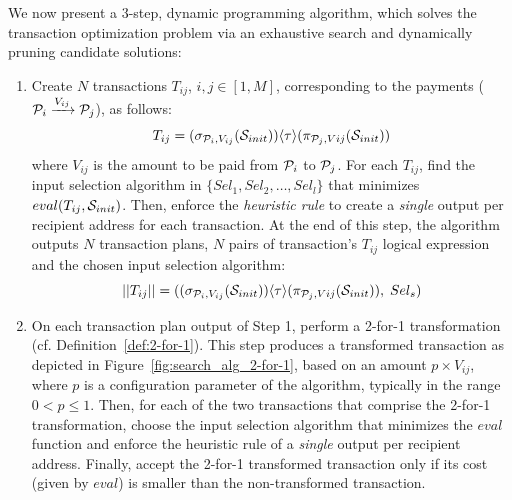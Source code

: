 We now present a 3-step, dynamic programming algorithm, which solves the
transaction optimization problem via an exhaustive search and
dynamically pruning candidate solutions:
\begin{enumerate}
    \item Create $N$ transactions $T_{ij}$, $i,j \in [1,M]$,
        corresponding to the payments ($\mathcal{P}_i \xrightarrow[]{V_{ij}} \mathcal{P}_j$),
        as follows:
        \begin{equation*}
            T_{ij} = (\sigma_{\mathcal{P}_i, V_{ij}}(\mathcal{S}_{init})) \langle \tau \rangle (\pi_{\mathcal{P}_j,V{ij}}(\mathcal{S}_{init}))
        \end{equation*}
        where $V_{ij}$ is the amount to be paid from $\mathcal{P}_i$ to $\mathcal{P}_j$.
        For each $T_{ij}$, find the input selection algorithm in
        $\{Sel_1, Sel_2, \dots, Sel_l\}$ that minimizes $eval(T_{ij},
        \mathcal{S}_{init})$. Then, enforce the \emph{heuristic rule} to
        create a \emph{single} output per recipient address for each
        transaction.
        At the end of this step, the algorithm outputs $N$ transaction plans,
        \ie $N$ pairs of transaction's $T_{ij}$ logical expression and the
        chosen
        input selection algorithm:
        \begin{equation*}
            ||T_{ij}|| = ((\sigma_{\mathcal{P}_i, V_{ij}}(\mathcal{S}_{init})) \langle \tau \rangle (\pi_{\mathcal{P}_j,V{ij}}(\mathcal{S}_{init})),\; Sel_s)
        \end{equation*}

    \item On each transaction plan output of Step 1, perform a 2-for-1
        transformation (cf. Definition~\ref{def:2-for-1}). This step produces a
        transformed transaction as
        depicted in Figure~\ref{fig:search_alg_2-for-1}, based on an amount
        $p\times V_{ij}$, where $p$ is a
        configuration parameter of the algorithm, typically in the range $0 < p
        \leq 1$.
        Then, for each of the two transactions that comprise the 2-for-1
        transformation, choose the input selection algorithm that minimizes the
        $eval$ function and enforce the heuristic rule of a \emph{single}
        output per recipient address.  Finally, accept the 2-for-1 transformed
        transaction only if its cost (given by $eval$) is smaller than the
        non-transformed transaction.


\end{enumerate}

